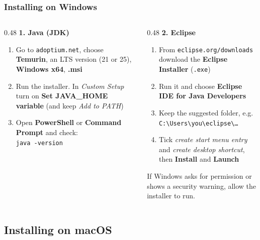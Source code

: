 \documentclass[aspectratio=169,10pt,compress]{beamer}
\newcommand{\cmd}[1]{\texttt{\color{gitred}#1}}
\newcommand{\menu}[1]{\textsf{\textbf{#1}}}                      %
\begin{document}
\begin{frame}[t,fragile] \frametitle{Installing on Windows}
  \begin{columns}[T]
    \begin{column}{0.48\textwidth}
      \textbf{1. Java (JDK)}
      \begin{enumerate}\small
        \item Go to \texttt{adoptium.net}, choose \textbf{Temurin}, an LTS version (21 or 25), \textbf{Windows x64}, \textbf{.msi}
        \item Run the installer. In \emph{Custom Setup} turn on \textbf{Set JAVA\_HOME variable}
              (and keep \emph{Add to PATH})
        \item Open \textbf{PowerShell} or \textbf{Command Prompt} and check:\\
              \cmd{java -version}
      \end{enumerate}
    \end{column}
    \begin{column}{0.48\textwidth}
      \textbf{2. Eclipse}
      \begin{enumerate}\small
        \item From \texttt{eclipse.org/downloads} download the \textbf{Eclipse Installer} (\texttt{.exe})
        \item Run it and choose \textbf{Eclipse IDE for Java Developers}
        \item Keep the suggested folder, e.g.\\ \texttt{C:\textbackslash Users\textbackslash you\textbackslash eclipse\textbackslash \dots}
        \item Tick \emph{create start menu entry} and \emph{create desktop shortcut}, then \menu{Install} and \menu{Launch}
      \end{enumerate}
      \small If Windows asks for permission or shows a security warning, allow the installer to run.
    \end{column}
  \end{columns}
\end{frame}

\subsection[macOS]{Installing on macOS}
\end{document}
